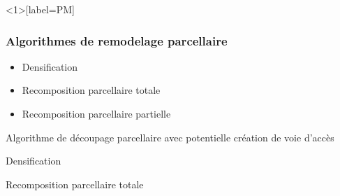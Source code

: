 \documentclass[xcolor=table]{beamer}
\begin{document}
\begin{frame}<1>[label=PM]
	\frametitle{Algorithmes de remodelage parcellaire}
	\begin{itemize}
		\item \alert<1>{Densification}
		\item \alert<2>{Recomposition parcellaire totale}
		\item \alert<3>{Recomposition parcellaire partielle}
	\end{itemize}
\end{frame}

\begin{frame}{Algorithme de découpage parcellaire avec potentielle création de voie d'accès}
\end{frame}

\begin{frame}{Densification}
\end{frame}


\begin{frame}{Recomposition parcellaire totale}
\end{frame}
\end{document}
